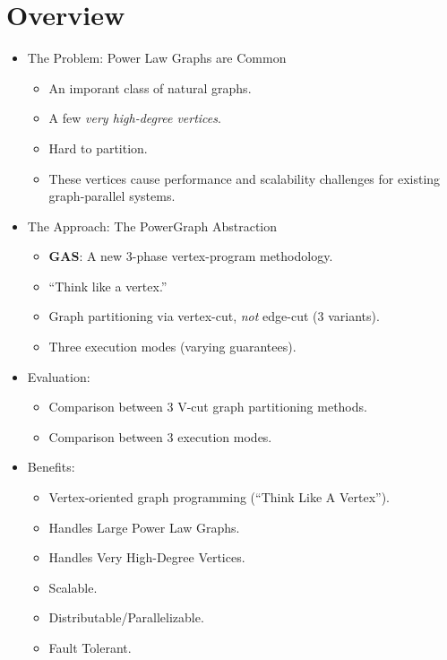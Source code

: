 \section*{Overview}

\begin{frame}
\begin{itemize}
  \frametitle{Overview}
  \item The Problem: Power Law Graphs are Common
  \begin{itemize}
    \item An imporant class of natural graphs.
    \item A few \textit{very high-degree vertices}.
    \item Hard to partition.
    \item These vertices cause performance and scalability challenges for
          existing graph-parallel systems.
  \end{itemize}
\end{itemize}
\end{frame}

\begin{frame}
\begin{itemize}
  \frametitle{Overview}
  \item The Approach: The PowerGraph Abstraction
  \begin{itemize}
    \item \textbf{GAS}: A new 3-phase vertex-program methodology.
    \item ``Think like a vertex.'' \citep[SIGMOD '10]{malewicz2010pregel}
    \item Graph partitioning via vertex-cut, \textit{not} edge-cut (3 variants).
    \item Three execution modes (varying guarantees).
  \end{itemize}

  \item Evaluation:
  \begin{itemize}
    \item Comparison between 3 V-cut graph partitioning methods.
    \item Comparison between 3 execution modes.
  \end{itemize}
\end{itemize}
\end{frame}

\begin{frame}
\begin{itemize}
  \frametitle{Overview}
  \item Benefits:
  \begin{itemize}
    \item Vertex-oriented graph programming (``Think Like A Vertex'').
    \item Handles Large Power Law Graphs.
    \item Handles Very High-Degree Vertices.
    \item Scalable.
    \item Distributable/Parallelizable.
    \item Fault Tolerant.
  \end{itemize}
\end{itemize}
\end{frame}

